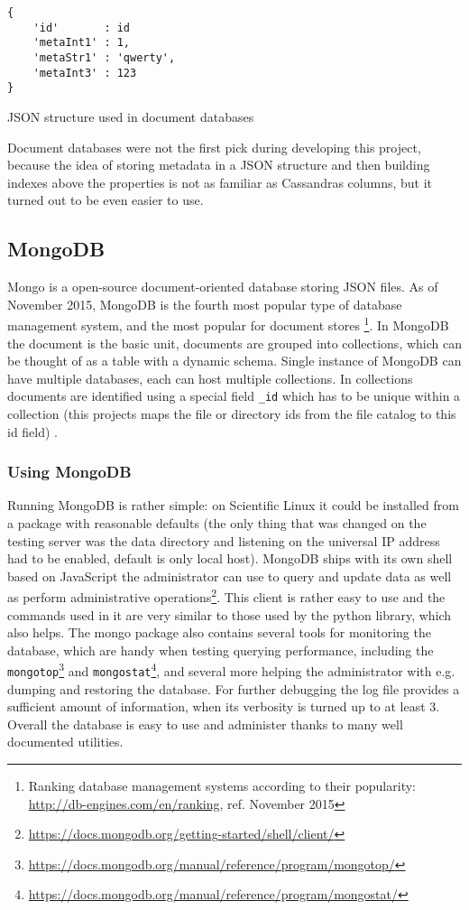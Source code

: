 \begin{listing}
\begin{verbatim}
{
	'id'       : id
	'metaInt1' : 1,
	'metaStr1' : 'qwerty',
	'metaInt3' : 123
}
\end{verbatim}
\caption{JSON structure used in document databases}
\end{listing}

Document databases were not the first pick during developing this project, because the idea of
storing metadata in a JSON structure and then building indexes above the properties is not as
familiar as Cassandras columns, but it turned out to be even easier to use.

\subsection{MongoDB}

Mongo is a open-source document-oriented database storing JSON files. As of November 2015, MongoDB is the fourth 
most popular type of database management system, and the most popular for document stores 
\footnote{Ranking database management systems according to their popularity: \url{http://db-engines.com/en/ranking}, ref. November 2015}. 
In MongoDB the document is the basic unit, documents are grouped into collections, which can be thought of as 
a table with a dynamic schema. Single instance of MongoDB can have multiple databases, each can host multiple 
collections. In collections documents are identified using a special field \texttt{\_id} which has to be unique
within a collection\cite{MongoBook} (this projects maps the file or directory ids from the file catalog 
to this id field) .

\subsubsection{Using MongoDB}

Running MongoDB is rather simple: on Scientific Linux it could be installed from a package with reasonable 
defaults (the only thing that was changed on the testing server was the data directory and listening on the 
universal IP address had to be enabled, default is only local host). MongoDB ships with its own shell based on
JavaScript the administrator can use to query and update data as well as perform administrative 
operations\footnote{\url{https://docs.mongodb.org/getting-started/shell/client/}}. This client is rather easy to
use and the commands used in it are very similar to those used by the python library, which also helps. The mongo
package also contains several tools for monitoring the database, which are handy when testing querying performance,
including the \texttt{mongotop}\footnote{\url{https://docs.mongodb.org/manual/reference/program/mongotop/}} 
and \texttt{mongostat}\footnote{\url{https://docs.mongodb.org/manual/reference/program/mongostat/}}, and several 
more helping the administrator with e.g. dumping and restoring the database. For further 
debugging the log file provides a sufficient amount of information, when its verbosity is turned up to at least 3.
Overall the database is easy to use and administer thanks to many well documented utilities. 

